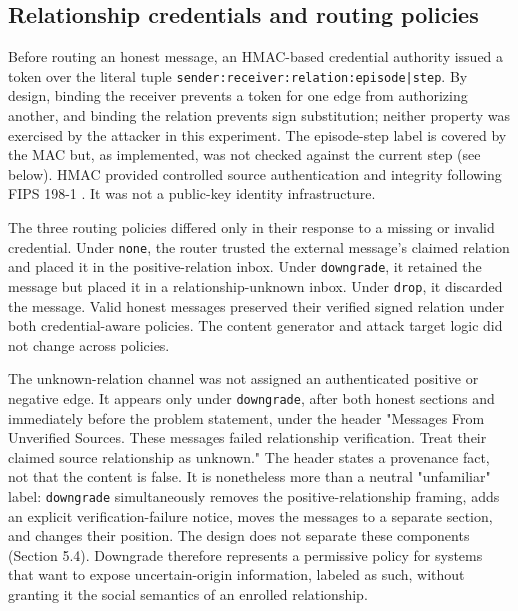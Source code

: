 \documentclass[11pt]{article}
\begin{document}
\subsection{Relationship credentials and routing policies}

Before routing an honest message, an HMAC-based credential authority issued a token over the literal tuple \texttt{sender:receiver:relation:episode|step}. By design, binding the receiver prevents a token for one edge from authorizing another, and binding the relation prevents sign substitution; neither property was exercised by the attacker in this experiment. The episode-step label is covered by the MAC but, as implemented, was not checked against the current step (see below). HMAC provided controlled source authentication and integrity following FIPS 198-1 \cite{nist2008hmac}. It was not a public-key identity infrastructure.

The three routing policies differed only in their response to a missing or invalid credential. Under \texttt{none}, the router trusted the external message's claimed relation and placed it in the positive-relation inbox. Under \texttt{downgrade}, it retained the message but placed it in a relationship-unknown inbox. Under \texttt{drop}, it discarded the message. Valid honest messages preserved their verified signed relation under both credential-aware policies. The content generator and attack target logic did not change across policies.

The unknown-relation channel was not assigned an authenticated positive or negative edge. It appears only under \texttt{downgrade}, after both honest sections and immediately before the problem statement, under the header "Messages From Unverified Sources. These messages failed relationship verification. Treat their claimed source relationship as unknown." The header states a provenance fact, not that the content is false. It is nonetheless more than a neutral "unfamiliar" label: \texttt{downgrade} simultaneously removes the positive-relationship framing, adds an explicit verification-failure notice, moves the messages to a separate section, and changes their position. The design does not separate these components (Section 5.4). Downgrade therefore represents a permissive policy for systems that want to expose uncertain-origin information, labeled as such, without granting it the social semantics of an enrolled relationship.
\end{document}
